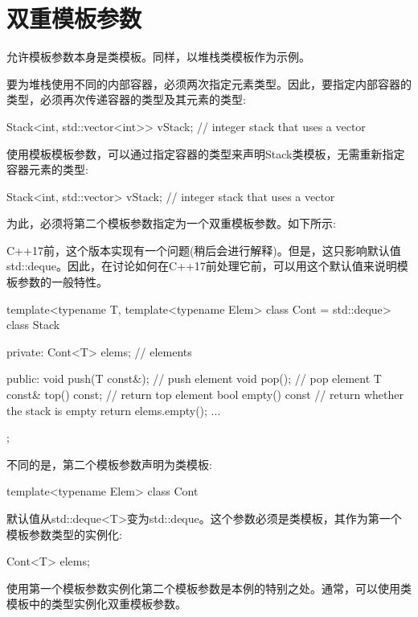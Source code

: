 \section{双重模板参数}
允许模板参数本身是类模板。同样，以堆栈类模板作为示例。

要为堆栈使用不同的内部容器，必须两次指定元素类型。因此，要指定内部容器的类型，必须再次传递容器的类型及其元素的类型:

\begin{cpp}
Stack<int, std::vector<int>> vStack; // integer stack that uses a vector
\end{cpp}

使用模板模板参数，可以通过指定容器的类型来声明Stack类模板，无需重新指定容器元素的类型:

\begin{cpp}
Stack<int, std::vector> vStack; // integer stack that uses a vector
\end{cpp}

为此，必须将第二个模板参数指定为一个双重模板参数。如下所示:

\begin{notice}
C++17前，这个版本实现有一个问题(稍后会进行解释)。但是，这只影响默认值std::deque。因此，在讨论如何在C++17前处理它前，可以用这个默认值来说明模板参数的一般特性。
\end{notice}

\begin{cpp}
template<typename T,
		template<typename Elem> class Cont = std::deque>
class Stack {
private:
	Cont<T> elems; // elements
	
public:
	void push(T const&); // push element
	void pop(); // pop element
	T const& top() const; // return top element
	bool empty() const { // return whether the stack is empty
		return elems.empty();
	}
	...
};
\end{cpp}

不同的是，第二个模板参数声明为类模板:

\begin{cpp}
template<typename Elem> class Cont
\end{cpp}

默认值从std::deque<T>变为std::deque。这个参数必须是类模板，其作为第一个模板参数类型的实例化:

\begin{cpp}
Cont<T> elems;
\end{cpp}

使用第一个模板参数实例化第二个模板参数是本例的特别之处。通常，可以使用类模板中的类型实例化双重模板参数。

